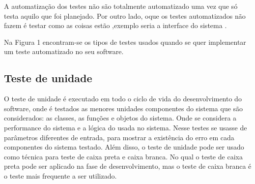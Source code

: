     A automatização dos testes não são totalmente automatizado uma vez que só testa aquilo que foi planejado. Por outro lado, oque os testes automatizados não fazem é testar como as coisas estão ,exemplo seria a interface do sistema \cite{EngSofSommerville}.
    
    
    
    
	Na Figura 1 encontram-se os tipos de testes usados quando se quer implementar um teste automatizado no seu software.  
    \begin{figure}[h!]
	\centering
       	{
		}	
	\end{figure}
    
\subsection{Teste de unidade}
\label{sec:Teste de unidade}
	O teste de unidade é executado em todo o ciclo de vida do desenvolvimento do software, onde é testados as menores unidades componentes do sistema que são considerados: as classes, as funções e objetos do sistema. Onde se considera a performance do sistema e a lógica do usada no sistema. Nesse testes se usasse de parâmetros diferentes de entrada, para mostrar a existência do erro em cada componentes do sistema testado. Além disso, o teste de unidade pode ser usado como técnica para teste de caixa preta e caixa branca. No qual o teste de caixa preta pode ser aplicado na fase de desenvolvimento, mas o teste de caixa branca é o teste mais frequente a ser utilizado. \cite{ReginaldoRe} 
    
